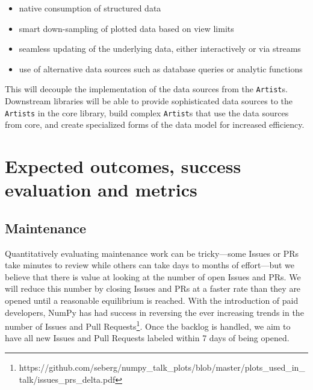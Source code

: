 \documentclass[11pt,letterpaper]{article}  %
\begin{document}
\begin{itemize}[noitemsep]
  \item native consumption of structured data
  \item smart down-sampling of plotted data based on view limits
  \item seamless updating of the underlying data, either interactively or via streams
  \item use of alternative data sources such as database queries or analytic functions
\end{itemize}

This will decouple the implementation of the data sources from the \texttt{Artist}s.  Downstream libraries will be able to provide sophisticated data sources to the \texttt{Artists} in the core library, build complex \texttt{Artist}s that use the data sources from core, and create specialized forms of the data model for increased efficiency. 


\section{Expected outcomes, success evaluation and metrics}
\subsection{Maintenance}

Quantitatively evaluating maintenance work can be tricky---some Issues
or PRs take minutes to review while others can take days to
months of effort---but we believe that there is value at looking at
the number of open Issues and PRs.  We will reduce this number by closing Issues and PRs at a faster rate than they are opened until a reasonable equilibrium is reached. With the introduction of paid developers, NumPy has had success in reversing the ever increasing trends in the number of Issues and Pull Requests\footnote{https://github.com/seberg/numpy\_talk\_plots/blob/master/plots\_used\_in\_talk/issues\_prs\_delta.pdf}. Once the backlog is handled, we aim to have all new Issues and Pull Requests labeled within 7 days of being opened.
\end{document}
